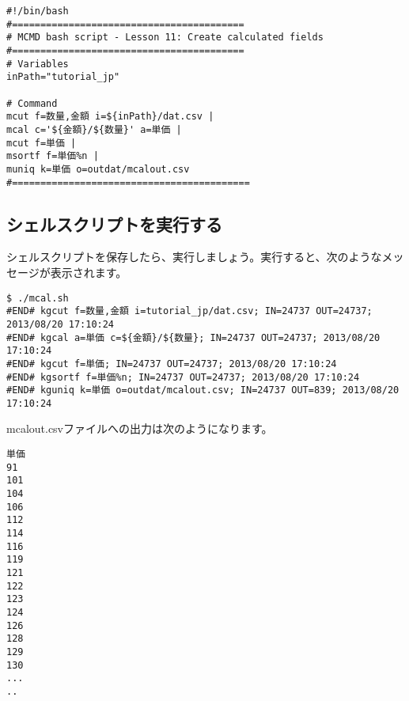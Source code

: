 \begin{verbatim}
#!/bin/bash
#=========================================
# MCMD bash script - Lesson 11: Create calculated fields
#=========================================
# Variables
inPath="tutorial_jp"

# Command 
mcut f=数量,金額 i=${inPath}/dat.csv | 
mcal c='${金額}/${数量}' a=単価 |   
mcut f=単価 |   
msortf f=単価%n |   
muniq k=単価 o=outdat/mcalout.csv
#==========================================
\end{verbatim}

\subsection{シェルスクリプトを実行する}
 
シェルスクリプトを保存したら、実行しましょう。実行すると、次のようなメッセージが表示されます。\\

\begin{verbatim}
$ ./mcal.sh 
#END# kgcut f=数量,金額 i=tutorial_jp/dat.csv; IN=24737 OUT=24737; 2013/08/20 17:10:24
#END# kgcal a=単価 c=${金額}/${数量}; IN=24737 OUT=24737; 2013/08/20 17:10:24
#END# kgcut f=単価; IN=24737 OUT=24737; 2013/08/20 17:10:24
#END# kgsortf f=単価%n; IN=24737 OUT=24737; 2013/08/20 17:10:24
#END# kguniq k=単価 o=outdat/mcalout.csv; IN=24737 OUT=839; 2013/08/20 17:10:24
\end{verbatim}

mcalout.csvファイルへの出力は次のようになります。

\begin{verbatim}
単価
91
101
104
106
112
114
116
119
121
122
123
124
126
128
129
130
...
..
\end{verbatim}


